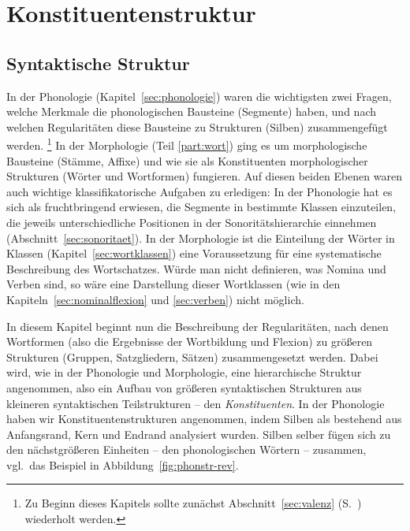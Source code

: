 \chapter{Konstituentenstruktur}

\label{sec:konstituentenstruktur}

\section{Syntaktische Struktur}

\label{sec:syntaktischestruktur}

In der Phonologie (Kapitel~\ref{sec:phonologie}) waren die wichtigsten zwei Fragen, welche Merkmale die phonologischen Bausteine (Segmente) haben, und nach welchen Regularitäten diese Bausteine zu Strukturen (\zB Silben) zusammengefügt werden.%
\footnote{Zu Beginn dieses Kapitels sollte zunächst Abschnitt~\ref{sec:valenz} (S.~\pageref{sec:valenz}) wiederholt werden.}
In der Morphologie (Teil \ref{part:wort}) ging es um morphologische Bausteine (Stämme, Affixe) und wie sie als Konstituenten morphologischer Strukturen (Wörter und Wortformen) fungieren.
Auf diesen beiden Ebenen waren auch wichtige klassifikatorische Aufgaben zu erledigen:
In der Phonologie hat es sich \zB als fruchtbringend erwiesen, die Segmente in bestimmte Klassen einzuteilen, die jeweils unterschiedliche Positionen in der Sonoritätshierarchie einnehmen (Abschnitt~\ref{sec:sonoritaet}).
In der Morphologie ist die Einteilung der Wörter in Klassen (Kapitel~\ref{sec:wortklassen}) eine Voraussetzung für eine systematische Beschreibung des Wortschatzes.
Würde man nicht definieren, was \zB Nomina und Verben sind, so wäre eine Darstellung dieser Wortklassen (wie in den Kapiteln~\ref{sec:nominalflexion} und \ref{sec:verben}) nicht möglich.

In diesem Kapitel beginnt nun die Beschreibung der Regularitäten, nach denen Wortformen (also die Ergebnisse der Wortbildung und Flexion) zu größeren Strukturen (Gruppen, Satzgliedern, Sätzen) zusammengesetzt werden.
Dabei wird, wie in der Phonologie und Morphologie, eine hierarchische Struktur angenommen, also ein Aufbau von größeren syntaktischen Strukturen aus kleineren syntaktischen Teilstrukturen -- den \textit{Konstituenten}.
In der Phonologie haben wir Konstituentenstrukturen angenommen, indem \zB Silben als bestehend aus Anfangsrand, Kern und Endrand analysiert wurden.
Silben selber fügen sich zu den nächstgrößeren Einheiten -- den phonologischen Wörtern -- zusammen, vgl.\ das Beispiel in Abbildung~\ref{fig:phonstr-rev}.

